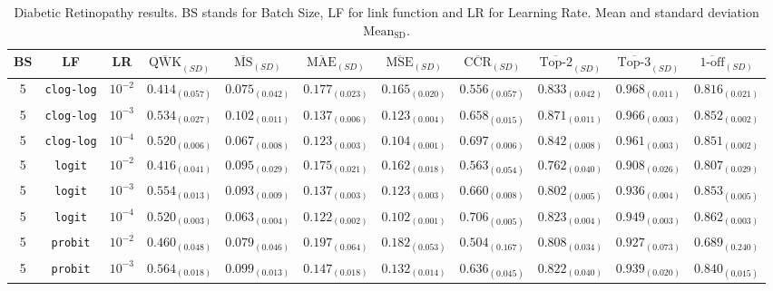 \documentclass[journal]{IEEEtran}
\begin{document}
	\begin{table}[!t]
		\caption{Diabetic Retinopathy results. BS stands for Batch Size, LF for link function and LR for Learning Rate. Mean and standard deviation $\text{Mean}_\text{SD}$.}
		\label{table:DRresults}
		\footnotesize
		\centering
		\begin{tabular}{c@{\hskip 0.15cm}c@{\hskip 0.15cm}c@{\hskip 0.15cm}c@{\hskip 0.30cm}c@{\hskip 0.20cm}c@{\hskip 0.20cm}c@{\hskip 0.20cm}c@{\hskip 0.20cm}c@{\hskip 0.20cm}c@{\hskip 0.20cm}c}
			\hline
			\hline
			BS & LF & LR & $\overline{\text{QWK}}_{{(SD)}}$ & $\overline{\text{MS}}_{{(SD)}}$ & $\overline{\text{MAE}}_{{(SD)}}$ & $\overline{\text{MSE}}_{{(SD)}}$ & $\overline{\text{CCR}}_{{(SD)}}$ & $\overline{\text{Top-2}}_{{(SD)}}$ & $\overline{\text{Top-3}}_{{(SD)}}$ & $\overline{\text{1-off}}_{{(SD)}}$\\\hline
			5 & \texttt{clog-log} & $10^{-2}$ & $0.414_{(0.057)}$ & $0.075_{(0.042)}$ & $0.177_{(0.023)}$ & $0.165_{(0.020)}$ & $0.556_{(0.057)}$ & $0.833_{(0.042)}$ & $0.968_{(0.011)}$ & $0.816_{(0.021)}$\\
			5 & \texttt{clog-log} & $10^{-3}$ & $0.534_{(0.027)}$ & $0.102_{(0.011)}$ & $0.137_{(0.006)}$ & $0.123_{(0.004)}$ & $0.658_{(0.015)}$ & $0.871_{(0.011)}$ & $0.966_{(0.003)}$ & $0.852_{(0.002)}$\\
			5 & \texttt{clog-log} & $10^{-4}$ & $0.520_{(0.006)}$ & $0.067_{(0.008)}$ & $0.123_{(0.003)}$ & $0.104_{(0.001)}$ & $0.697_{(0.006)}$ & $0.842_{(0.008)}$ & $0.961_{(0.003)}$ & $0.851_{(0.002)}$\\
			5 & \texttt{logit} & $10^{-2}$ & $0.416_{(0.041)}$ & $0.095_{(0.029)}$ & $0.175_{(0.021)}$ & $0.162_{(0.018)}$ & $0.563_{(0.054)}$ & $0.762_{(0.040)}$ & $0.908_{(0.026)}$ & $0.807_{(0.029)}$\\
			5 & \texttt{logit} & $10^{-3}$ & $0.554_{(0.013)}$ & $0.093_{(0.009)}$ & $0.137_{(0.003)}$ & $0.123_{(0.003)}$ & $0.660_{(0.008)}$ & $0.802_{(0.005)}$ & $0.936_{(0.004)}$ & $0.853_{(0.005)}$\\
			5 & \texttt{logit} & $10^{-4}$ & $0.520_{(0.003)}$ & $0.063_{(0.004)}$ & $0.122_{(0.002)}$ & $0.102_{(0.001)}$ & $0.706_{(0.005)}$ & $0.823_{(0.004)}$ & $0.949_{(0.003)}$ & $0.862_{(0.003)}$\\
			5 & \texttt{probit} & $10^{-2}$ & $0.460_{(0.048)}$ & $0.079_{(0.046)}$ & $0.197_{(0.064)}$ & $0.182_{(0.053)}$ & $0.504_{(0.167)}$ & $0.808_{(0.034)}$ & $0.927_{(0.073)}$ & $0.689_{(0.240)}$\\
			5 & \texttt{probit} & $10^{-3}$ & $0.564_{(0.018)}$ & $0.099_{(0.013)}$ & $0.147_{(0.018)}$ & $0.132_{(0.014)}$ & $0.636_{(0.045)}$ & $0.822_{(0.040)}$ & $0.939_{(0.020)}$ & $0.840_{(0.015)}$\\

\end{tabular}
\end{table}
\end{document}
